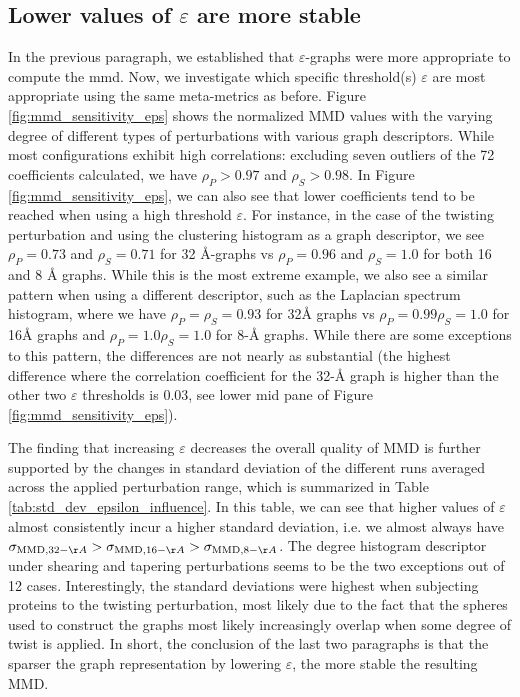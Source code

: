 \subsection{Lower values of $\varepsilon$ are more stable} In the previous paragraph, we established that $\varepsilon$-graphs were more
appropriate to compute the \acrshort{mmd}. Now, we investigate which specific
threshold(s) $\varepsilon$ are most appropriate using the same meta-metrics as
before. Figure \ref{fig:mmd_sensitivity_eps} shows the normalized MMD values
with the varying degree of different types of perturbations with various graph
descriptors. While most configurations exhibit high correlations: excluding
seven outliers of the 72 coefficients calculated, we have $\rho_P>0.97$ and
$\rho_S>0.98$. In Figure \ref{fig:mmd_sensitivity_eps}, we can also see that
lower coefficients tend to be reached when using a high threshold $\varepsilon$.
For instance, in the case of the twisting perturbation and using the clustering
histogram as a graph descriptor, we see $\rho_P=0.73$ and $\rho_S=0.71$ for 32
\si{\angstrom}-graphs vs $\rho_P=0.96$ and $\rho_S=1.0$ for both 16 and 8
\si{\angstrom} graphs. While this is the most extreme example, we also see a
similar pattern when using a different descriptor, such as the Laplacian
spectrum histogram, where we have $\rho_P=\rho_S=0.93$ for 32\si{\angstrom}
graphs vs $\rho_P=0.99 \rho_S=1.0$ for 16\si{\angstrom} graphs and $\rho_P=1.0
\rho_S=1.0$ for 8-\si{\angstrom} graphs. While there are some exceptions to this
pattern, the differences are not nearly as substantial (the highest difference
where the correlation coefficient for the 32-\si{\angstrom} graph is higher than
the other two $\varepsilon$ thresholds is 0.03, see lower mid pane of Figure
\ref{fig:mmd_sensitivity_eps}).

The finding that increasing $\varepsilon$ decreases the overall quality of MMD
is further supported by the changes in standard deviation of the different runs
averaged across the applied perturbation range, which is summarized in Table
\ref{tab:std_dev_epsilon_influence}. In this table, we can see that higher
values of $\varepsilon$ almost consistently incur a higher standard deviation,
i.e. we almost always have $\sigma_{\MMD, 32-\AA}>\sigma_{\MMD,
16-\AA}>\sigma_{\MMD, 8-\AA}$. The degree histogram descriptor under shearing
and tapering perturbations seems to be the two exceptions out of 12 cases.
Interestingly, the standard deviations were highest when subjecting proteins to
the twisting perturbation, most likely due to the fact that the spheres used to
construct the graphs most likely increasingly overlap when some degree of twist
is applied. In short, the conclusion of the last two paragraphs is that the
sparser the graph representation by lowering $\varepsilon$, the more stable the
resulting MMD.

